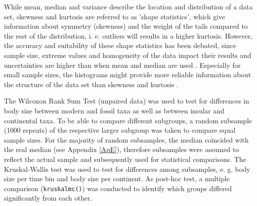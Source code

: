 While mean, median and variance describe the location and distribution of a data set, skewness and kurtosis are referred to as 'shape statistics', which give information about symmetry (skewness) and the weight of the tails compared to the rest of the distribution, i. e. outliers will results in a higher kurtosis. However, the accuracy and suitability of these shape statistics has been debated, since sample size, extreme values and homogeneity of the data impact their results and uncertainties are higher than when mean and median are used \citep{McNeese2016, Bai2005}. Especially for small sample sizes, the histograms might provide more reliable information about the structure of the data set than skewness and kurtosis \citep{McNeese2016}.

The Wilcoxon Rank Sum Test (unpaired data) was used to test for differences in body size between modern and fossil taxa as well as between insular and continental taxa. To be able to compare different subgroups, a random subsample (1000 repeats) of the respective larger subgroup was taken to compare equal sample sizes. For the majority of random subsamples, the median coincided with the real median (see Appendix \ref{ApE}), therefore subsamples were assumed to reflect the actual sample and subsequently used for statistical comparisons.
The Kruskal-Wallis test was used to test for differences among subsamples, e. g. body size per time bin and body size per continent.
As post-hoc test, a multiple comparison (\texttt{kruskalmc()}) \citep{Siegel1988} was conducted to identify which groups differed significantly from each other.



